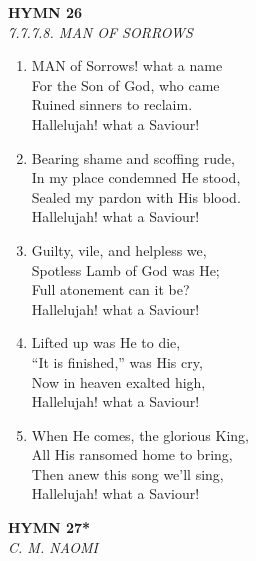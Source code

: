 \documentclass[11pt,a4paper]{article}
\begin{document}
\newpage
\begin{center}
    {\Large \textbf{HYMN 26}}
    \\
    \textit{7.7.7.8. MAN OF SORROWS}
\end{center}
\vspace{1em}

\begin{enumerate}
    \item MAN of Sorrows! what a name \\
        For the Son of God, who came \\
        Ruined sinners to reclaim. \\
        Hallelujah! what a Saviour!

    \item Bearing shame and scoffing rude, \\
        In my place condemned He stood, \\
        Sealed my pardon with His blood. \\
        Hallelujah! what a Saviour!

    \item Guilty, vile, and helpless we, \\
        Spotless Lamb of God was He; \\
        Full atonement can it be? \\
        Hallelujah! what a Saviour!

    \item Lifted up was He to die, \\
        ``It is finished,'' was His cry, \\
        Now in heaven exalted high, \\
        Hallelujah! what a Saviour!

    \item When He comes, the glorious King, \\
        All His ransomed home to bring, \\
        Then anew this song we'll sing, \\
        Hallelujah! what a Saviour!

\end{enumerate}

\newpage
\begin{center}
    {\Large \textbf{HYMN 27*}}
    \\
    \textit{C. M. NAOMI}
\end{center}
\vspace{1em}
\end{document}
